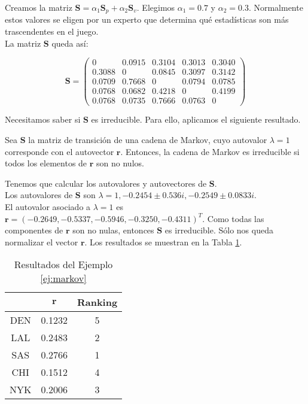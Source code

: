 \begin{ejemplo}
Creamos la matriz $\mathbf{S} = \alpha_1 \mathbf{S}_p + \alpha_2 \mathbf{S}_v$. Elegimos $\alpha_1 = 0.7$ y $\alpha_2 = 0.3$. Normalmente estos valores se eligen por un experto que determina qué estadísticas son más trascendentes en el juego.\\

La matriz $\mathbf{S}$ queda así:

\[ \mathbf{S} = \left(\begin{array}{rrrrr}
0      & 0.0915 & 0.3104 & 0.3013 & 0.3040 \\
0.3088 & 0      & 0.0845 & 0.3097 & 0.3142 \\
0.0709 & 0.7668 & 0      & 0.0794 & 0.0785 \\
0.0768 & 0.0682 & 0.4218 & 0      & 0.4199 \\
0.0768 & 0.0735 & 0.7666 & 0.0763 & 0

\end{array}\right) \]

Necesitamos saber si $\mathbf{S}$ es irreducible. Para ello, aplicamos el siguiente resultado.\\

\begin{prop}
Sea $\mathbf{S}$ la matriz de transición de una cadena de Markov, cuyo autovalor $\lambda = 1$ corresponde con el autovector $\mathbf{r}$. Entonces, la cadena de Markov es irreducible si todos los elementos de $\mathbf{r}$ son no nulos.
\end{prop}


Tenemos que calcular los autovalores y autovectores de $\mathbf{S}$.\\

Los autovalores de $\mathbf{S}$ son $\lambda = 1, -0.2454 \pm 0.536i, -0.2549 \pm 0.0833i$.\\
El autovalor asociado a $\lambda = 1$ es $\mathbf{r} = (-0.2649, -0.5337, -0.5946, -0.3250, -0.4311)^T$. Como todas las componentes de $\mathbf{r}$ son no nulas, entonces $\mathbf{S}$ es irreducible. Sólo nos queda normalizar el vector $\mathbf{r}$. Los resultados se muestran en la Tabla \ref{tbl:markov_resultados}. 

\begin{table}[h]
\centering
\caption{Resultados del Ejemplo \ref{ej:markov}}
\label{tbl:markov_resultados}
\begin{tabular}{@{}ccc@{}}
\cmidrule(l){2-3}
    & $\mathbf{r}$ & Ranking \\ \midrule
DEN & 0.1232       & 5       \\
LAL & 0.2483       & 2       \\
SAS & 0.2766       & 1       \\
CHI & 0.1512       & 4       \\
NYK & 0.2006       & 3       \\ \bottomrule
\end{tabular}
\end{table}

\end{ejemplo}

